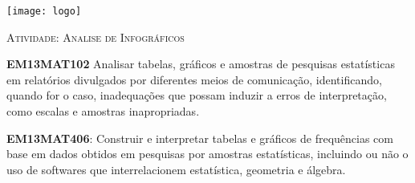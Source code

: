 \documentclass[10 pt,usenames,dvipsnames, oneside]{article}
\begin{document}
\begin{center}
  \begin{minipage}[l]{3cm}
\texttt{[image: logo]}    
\end{minipage}\hfill
\begin{minipage}[r]{.8\textwidth}
 {\Large \scshape Atividade: Analise de Infográficos}  
\end{minipage}
\end{center}
\vspace{.2cm}

\ifdefined\prof
\begin{objetivos}
\item \textbf{EM13MAT102} Analisar tabelas, gráficos e amostras de pesquisas estatísticas em relatórios divulgados por diferentes meios de comunicação, identificando, quando for o caso, inadequações que possam induzir a erros de interpretação, como escalas e amostras inapropriadas.

\item \textbf{EM13MAT406}: Construir e interpretar tabelas e gráficos de frequências com base em dados obtidos em pesquisas por amostras estatísticas, incluindo ou não o uso de softwares que interrelacionem estatística, geometria e álgebra.
\end{objetivos}
\end{document}
